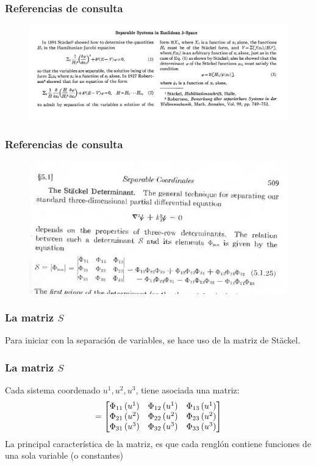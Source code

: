 \documentclass[12pt]{beamer}
\begin{document}
\begin{frame}
\frametitle{Referencias de consulta}
\begin{figure}
\centering
\includegraphics[scale=0.33]{Imagenes/Referencia_Eisenhart_02.png}
\end{figure}
\end{frame}
\begin{frame}
\frametitle{Referencias de consulta}
\begin{figure}
  \centering
  \includegraphics[scale=0.33]{Imagenes/Referencia_Morse.png}
\end{figure}
\end{frame}
\begin{frame}
\frametitle{La matriz $S$}
Para iniciar con la separación de variables, se hace uso de la matriz de Stäckel.
\end{frame}
\begin{frame}
\frametitle{La matriz $S$}
Cada sistema coordenado $u^{1}, u^{2}, u^{3}$, tiene asociada una matriz:
\pause
\begin{align}
[S] = \mqty[
\Phi_{11} \, (u^{1}) & \Phi_{12} \, (u^{1}) & \Phi_{13} \, (u^{1}) \\
\Phi_{21} \, (u^{2}) & \Phi_{22} \, (u^{2}) & \Phi_{23} \, (u^{2}) \\
\Phi_{31} \, (u^{3}) & \Phi_{32} \, (u^{3}) & \Phi_{33} \, (u^{3})
]
\label{eq:matriz_Stackel}
\end{align}
\pause
La principal característica de la matriz, es que cada renglón contiene funciones de una sola variable (o constantes)
\end{frame}
\end{document}
